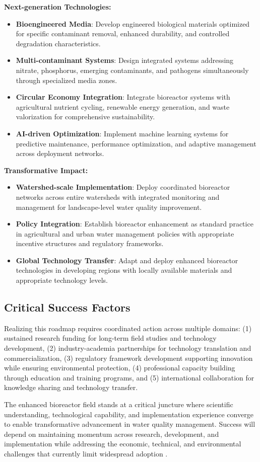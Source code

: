 \documentclass[12pt,a4paper]{article}
\begin{document}
{\textbf{Next-generation Technologies:}
\begin{itemize}
\item \textbf{Bioengineered Media}: Develop engineered biological materials optimized for specific contaminant removal, enhanced durability, and controlled degradation characteristics.
\item \textbf{Multi-contaminant Systems}: Design integrated systems addressing nitrate, phosphorus, emerging contaminants, and pathogens simultaneously through specialized media zones.
\item \textbf{Circular Economy Integration}: Integrate bioreactor systems with agricultural nutrient cycling, renewable energy generation, and waste valorization for comprehensive sustainability.
\item \textbf{AI-driven Optimization}: Implement machine learning systems for predictive maintenance, performance optimization, and adaptive management across deployment networks.
\end{itemize}

\textbf{Transformative Impact:}
\begin{itemize}
\item \textbf{Watershed-scale Implementation}: Deploy coordinated bioreactor networks across entire watersheds with integrated monitoring and management for landscape-level water quality improvement.
\item \textbf{Policy Integration}: Establish bioreactor enhancement as standard practice in agricultural and urban water management policies with appropriate incentive structures and regulatory frameworks.
\item \textbf{Global Technology Transfer}: Adapt and deploy enhanced bioreactor technologies in developing regions with locally available materials and appropriate technology levels.
\end{itemize}

\subsection{Critical Success Factors}

Realizing this roadmap requires coordinated action across multiple domains: (1) sustained research funding for long-term field studies and technology development, (2) industry-academia partnerships for technology translation and commercialization, (3) regulatory framework development supporting innovation while ensuring environmental protection, (4) professional capacity building through education and training programs, and (5) international collaboration for knowledge sharing and technology transfer.

The enhanced bioreactor field stands at a critical juncture where scientific understanding, technological capability, and implementation experience converge to enable transformative advancement in water quality management. Success will depend on maintaining momentum across research, development, and implementation while addressing the economic, technical, and environmental challenges that currently limit widespread adoption \citep{RN625, RN310}.}
\end{document}
